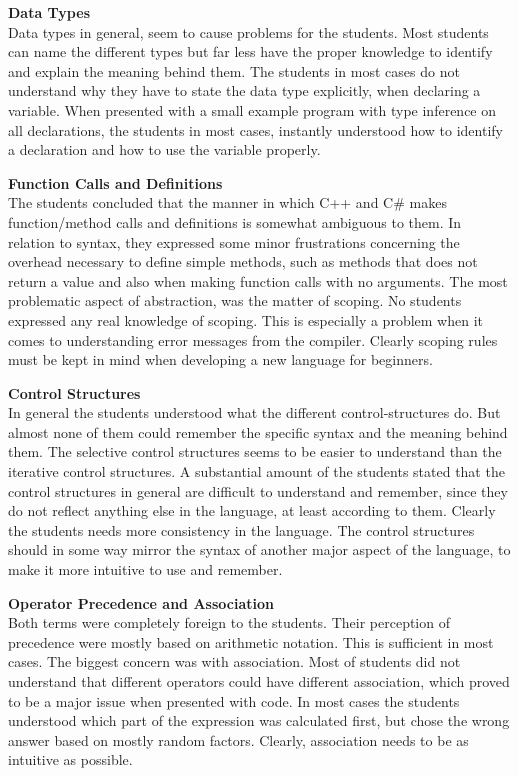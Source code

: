 \textbf{Data Types}\\
Data types in general, seem to cause problems for the students. 
Most students can name the different types but far less have the proper knowledge to identify and explain the meaning behind them. 
The students in most cases do not understand why they have to state the data type explicitly, when declaring a variable. 
When presented with a small example program with type inference on all declarations, the students in most cases, instantly understood how to identify a declaration and how to use the variable properly.

\textbf{Function Calls and Definitions}\\
The students concluded that the manner in which C++ and C{\#} makes function/method calls and definitions is somewhat ambiguous to them. 
In relation to syntax, they expressed some minor frustrations concerning the overhead necessary to define simple methods, such as methods that does not return a value and also when making function calls with no arguments. 
The most problematic aspect of abstraction, was the matter of scoping. 
No students expressed any real knowledge of scoping. 
This is especially a problem when it comes to understanding error messages from the compiler. 
Clearly scoping rules must be kept in mind when developing a new language for beginners.

\textbf{Control Structures}\\
In general the students understood what the different control-structures do. 
But almost none of them could remember the specific syntax and the meaning behind them. 
The selective control structures seems to be easier to understand than the iterative control structures. 
A substantial amount of the students stated that the control structures in general are difficult to understand and remember, since they do not reflect anything else in the language, at least according to them.
Clearly the students needs more consistency in the language. 
The control structures should in some way mirror the syntax of another major aspect of the language, to make it more intuitive to use and remember.

\textbf{Operator Precedence and Association}\\
Both terms were completely foreign to the students. 
Their perception of precedence were mostly based on arithmetic notation. 
This is sufficient in most cases. 
The biggest concern was with association. 
Most of students did not understand that different operators could have different association, which proved to be a major issue when presented with code. 
In most cases the students understood which part of the expression was calculated first, but chose the wrong answer based on mostly random factors. 
Clearly, association needs to be as intuitive as possible.

